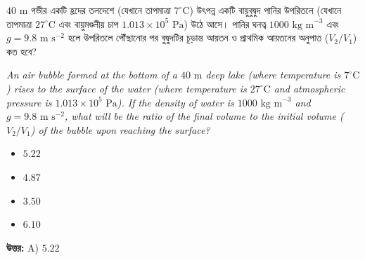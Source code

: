 \documentclass[12pt, a4paper]{article}
\begin{document}
\begin{tcolorbox}[questionbox={প্রশ্ন (Question) 13}]
    \noindent
    $40\text{ m}$ গভীর একটি হ্রদের তলদেশে (যেখানে তাপমাত্রা $7^\circ\text{C}$) উৎপন্ন একটি বায়ুবুদ্বুদ পানির উপরিতলে (যেখানে তাপমাত্রা $27^\circ\text{C}$ এবং বায়ুমণ্ডলীয় চাপ $1.013 \times 10^5\text{ Pa}$) উঠে আসে। পানির ঘনত্ব $1000\text{ kg m}^{-3}$ এবং $g = 9.8\text{ m s}^{-2}$ হলে উপরিতলে পৌঁছানোর পর বুদ্বুদটির চূড়ান্ত আয়তন ও প্রাথমিক আয়তনের অনুপাত ($V_2 / V_1$) কত হবে?
    
    \vspace{0.8em}
    \begin{english}
    \noindent\textit{\color{darkgray}
    An air bubble formed at the bottom of a $40\text{ m}$ deep lake (where temperature is $7^\circ\text{C}$) rises to the surface of the water (where temperature is $27^\circ\text{C}$ and atmospheric pressure is $1.013 \times 10^5\text{ Pa}$). If the density of water is $1000\text{ kg m}^{-3}$ and $g = 9.8\text{ m s}^{-2}$, what will be the ratio of the final volume to the initial volume ($V_2 / V_1$) of the bubble upon reaching the surface?
    }
    \end{english}
\end{tcolorbox}

\begin{itemize}[label={}, leftmargin=1cm, itemsep=0.5em]
    \item[\textbf{A)}] $5.22$
    \item[\textbf{B)}] $4.87$
    \item[\textbf{C)}] $3.50$
    \item[\textbf{D)}] $6.10$
\end{itemize}

\vspace{0.5em}
\begin{tcolorbox}[answerbox]
    \textbf{\color{success} উত্তর:} A) $5.22$
\end{tcolorbox}
\vspace{1em}
\end{document}
